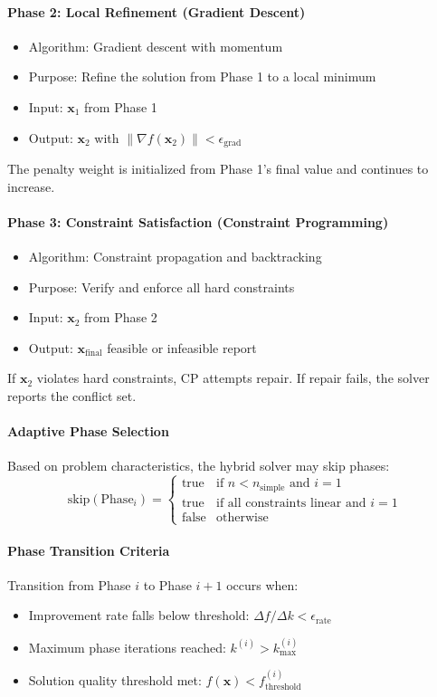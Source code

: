 \documentclass{report}
\begin{document}
\paragraph{Phase 2: Local Refinement (Gradient Descent)}
\begin{itemize}
\item Algorithm: Gradient descent with momentum
\item Purpose: Refine the solution from Phase 1 to a local minimum
\item Input: $\mathbf{x}_1$ from Phase 1
\item Output: $\mathbf{x}_2$ with $\|\nabla f(\mathbf{x}_2)\| < \epsilon_{\text{grad}}$
\end{itemize}
The penalty weight is initialized from Phase 1's final value and continues to increase.

\paragraph{Phase 3: Constraint Satisfaction (Constraint Programming)}
\begin{itemize}
\item Algorithm: Constraint propagation and backtracking
\item Purpose: Verify and enforce all hard constraints
\item Input: $\mathbf{x}_2$ from Phase 2
\item Output: $\mathbf{x}_{\text{final}}$ feasible or infeasible report
\end{itemize}
If $\mathbf{x}_2$ violates hard constraints, CP attempts repair. If repair fails, the solver reports the conflict set.

\paragraph{Adaptive Phase Selection}
Based on problem characteristics, the hybrid solver may skip phases:
\begin{equation}
\text{skip}(\text{Phase}_i) = \begin{cases}
\text{true} & \text{if } n < n_{\text{simple}} \text{ and } i = 1 \\
\text{true} & \text{if } \text{all constraints linear} \text{ and } i = 1 \\
\text{false} & \text{otherwise}
\end{cases}
\end{equation}

\paragraph{Phase Transition Criteria}
Transition from Phase $i$ to Phase $i+1$ occurs when:
\begin{itemize}
\item Improvement rate falls below threshold: $\Delta f / \Delta k < \epsilon_{\text{rate}}$
\item Maximum phase iterations reached: $k^{(i)} > k_{\max}^{(i)}$
\item Solution quality threshold met: $f(\mathbf{x}) < f_{\text{threshold}}^{(i)}$
\end{itemize}
\end{document}
